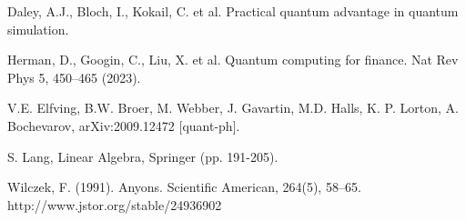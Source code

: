 \documentclass[12pt]{report}
\begin{document}
\begin{thebibliography}{99}
		 Daley, A.J., Bloch, I., Kokail, C. et al. Practical quantum advantage in quantum simulation.
		
		 Herman, D., Googin, C., Liu, X. et al. Quantum computing for finance. Nat Rev Phys 5, 450–465 (2023).
		
		 V.E. Elfving, B.W. Broer, M. Webber, J. Gavartin, M.D. Halls, K. P. Lorton, A. Bochevarov, arXiv:2009.12472 [quant-ph].
		
		 S. Lang, Linear Algebra, Springer (pp. 191-205).
		
		 Wilczek, F. (1991). Anyons. Scientific American, 264(5), 58–65. http://www.jstor.org/stable/24936902
  
	\end{thebibliography}
	
\end{document}
